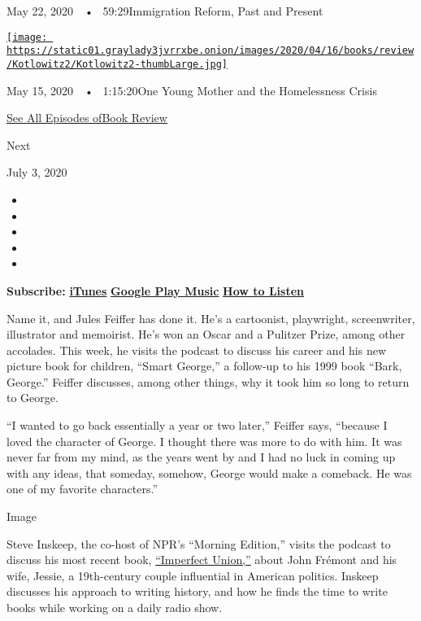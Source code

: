 May 22, 2020~~•~ 59:29Immigration Reform, Past and Present

\href{https://www.nytimes3xbfgragh.onion/2020/05/15/books/review/podcast-lauren-sandler-this-is-all-i-got-sarah-weinman-crime-fiction.html?action=click\&module=audio-series-bar\&region=header\&pgtype=Article}{\texttt{[image: https://static01.graylady3jvrrxbe.onion/images/2020/04/16/books/review/Kotlowitz2/Kotlowitz2-thumbLarge.jpg]}}

May 15, 2020~~•~ 1:15:20One Young Mother and the Homelessness Crisis

\href{https://www.nytimes3xbfgragh.onion/column/book-review-podcast}{See
All Episodes ofBook Review}

Next

July 3, 2020

\begin{itemize}
\item
\item
\item
\item
\item
\end{itemize}

\textbf{Subscribe:}
\textbf{\href{https://itunes.apple.com/us/podcast/book-review/id120315179?mt=2}{iTunes}}
\textbf{\textbar{}}
\textbf{\href{https://play.google.com/music/listen?u=0\#/ps/Iv6zeb5qwjtzjfbyo3vy5zny5ky}{Google
Play Music}} \textbf{\textbar{}}
\textbf{\href{https://www.nytimes3xbfgragh.onion/2018/08/03/books/review/how-to-listen-to-the-book-review-podcast.html}{How
to Listen}}

Name it, and Jules Feiffer has done it. He's a cartoonist, playwright,
screenwriter, illustrator and memoirist. He's won an Oscar and a
Pulitzer Prize, among other accolades. This week, he visits the podcast
to discuss his career and his new picture book for children, ``Smart
George,'' a follow-up to his 1999 book ``Bark, George.'' Feiffer
discusses, among other things, why it took him so long to return to
George.

``I wanted to go back essentially a year or two later,'' Feiffer says,
``because I loved the character of George. I thought there was more to
do with him. It was never far from my mind, as the years went by and I
had no luck in coming up with any ideas, that someday, somehow, George
would make a comeback. He was one of my favorite characters.''

Image

Steve Inskeep, the co-host of NPR's ``Morning Edition,'' visits the
podcast to discuss his most recent book,
\href{https://www.nytimes3xbfgragh.onion/2020/01/14/books/review-imperfect-union-steve-inskeep-jessie-john-fremont-civil-war.html}{``Imperfect
Union,''} about John Frémont and his wife, Jessie, a 19th-century couple
influential in American politics. Inskeep discusses his approach to
writing history, and how he finds the time to write books while working
on a daily radio show.


